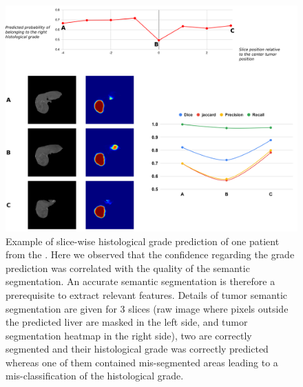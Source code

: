 \begin{figure}[th!]
\centering
\includegraphics[width=0.9\linewidth]{HistologicalGradePrediction/images/Slice_hist_grad_prediction_details}
\caption{Example of slice-wise histological grade prediction of one patient from the . Here we observed that the confidence regarding the grade prediction was correlated with the quality of the semantic segmentation. An accurate semantic segmentation is therefore a prerequisite to extract relevant features. Details of tumor semantic segmentation are given for 3 slices (raw image where pixels outside the predicted liver are masked in the left side, and tumor segmentation heatmap in the right side), two are correctly segmented and their histological grade was correctly predicted whereas one of them contained mis-segmented areas leading to a mis-classification of the histological grade.}
\label{fig:Slice_hist_grad_prediction_details}
\end{figure}




